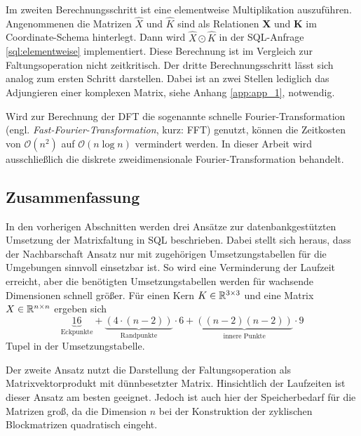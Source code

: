     

Im zweiten Berechnungsschritt ist eine elementweise Multiplikation auszuführen. Angenommenen die Matrizen $\hat{X}$ und $\hat{K}$ sind als Relationen \textbf{X}
und \textbf{K} im Coordinate-Schema hinterlegt. Dann wird $\hat{X} \odot \hat{K}$ in der SQL-Anfrage \ref{sql:elementweise} implementiert. Diese Berechnung ist im Vergleich zur Faltungsoperation nicht zeitkritisch.
Der dritte Berechnungsschritt lässt sich analog zum ersten Schritt darstellen. Dabei ist an zwei Stellen lediglich das Adjungieren einer komplexen Matrix, siehe Anhang \ref{app:app_1}, notwendig.



Wird zur Berechnung der DFT die sogenannte schnelle Fourier-Transformation (engl. \textit{Fast-Fourier-Transformation}, kurz: FFT) genutzt, können die Zeitkosten von $\mathcal{O}(n^2)$ auf $\mathcal{O}(n \log n)$ vermindert werden. In dieser Arbeit wird ausschließlich die diskrete zweidimensionale Fourier-Transformation behandelt. 

\subsection{Zusammenfassung}
\label{abs:sum_conc_in_sql}
In den vorherigen Abschnitten werden drei Ansätze zur datenbankgestützten Umsetzung der Matrixfaltung in SQL beschrieben. Dabei stellt sich heraus, dass der Nachbarschaft Ansatz nur mit zugehörigen Umsetzungstabellen für die Umgebungen sinnvoll einsetzbar ist. So wird eine Verminderung der Laufzeit erreicht, aber die benötigten Umsetzungstabellen werden für wachsende Dimensionen schnell größer. Für einen Kern $K \in \mathbb{R}^{3 \times 3}$ und eine Matrix $X \in \mathbb{R}^{n \times n}$ ergeben sich  
\begin{equation*}
    \underbrace{16}_{\text{Eckpunkte}}+\underbrace{(4\cdot(n-2))}_{\text{Randpunkte}} \cdot 6 +\underbrace{((n-2)(n-2))}_{\text{innere Punkte}} \cdot 9
\end{equation*}
Tupel in der Umsetzungstabelle.

Der zweite Ansatz nutzt die Darstellung der Faltungsoperation als Matrixvektorprodukt mit dünnbesetzter Matrix. Hinsichtlich der Laufzeiten ist dieser Ansatz am besten geeignet. Jedoch ist auch hier der Speicherbedarf für die Matrizen groß, da die Dimension $n$ bei der Konstruktion der zyklischen Blockmatrizen quadratisch eingeht. 

